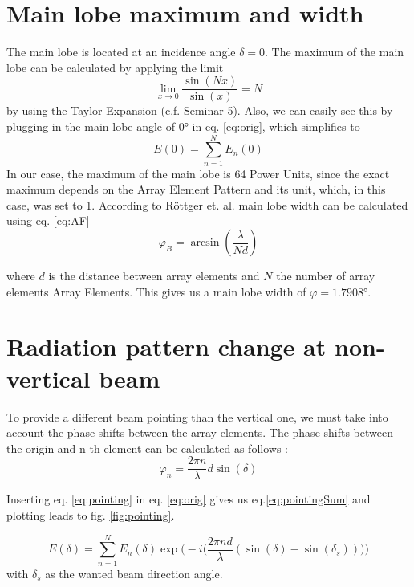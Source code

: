 \section{Main lobe maximum and width}
The main lobe is located at an incidence angle $\delta = 0$. 
The maximum of the main lobe can be calculated by applying the limit $$\lim_{x\to0} \frac{\sin(Nx)}{\sin(x)} = N $$ by using the Taylor-Expansion (c.f. Seminar 5).
Also, we can easily see this by plugging in the main lobe angle of 0° in eq. \ref{eq:orig}, which simplifies to
\begin{equation}
	E(0) = \sum_{n=1}^N E_n(0)
\end{equation}
In our case, the maximum of the main lobe is 64 Power Units, since the exact maximum depends on the Array Element Pattern and its unit, which, in this case, was set to 1.
According to Röttger et. al. \citep{roettger1989instrumental} main lobe width can be calculated using eq. \ref{eq:AF}
\begin{equation}
	\varphi_{B} = \arcsin(\frac{\lambda}{Nd})
\end{equation}

where $d$ is the distance between array elements and $N$ the number of array elements Array Elements. This gives us a main lobe width of $\varphi = 1.7908$°.


\section{Radiation pattern change at non-vertical beam}
To provide a different beam pointing than the vertical one, we must take into account the phase shifts between the array elements. The phase shifts between the origin and n-th element can be calculated as follows \citep{richards2010principles}:
\begin{equation}
	\varphi_n = \frac{2\pi n}{\lambda}d \sin(\delta)
	\label{eq:pointing}
\end{equation}

Inserting eq. \ref{eq:pointing} in eq. \ref{eq:orig} gives us eq.\ref{eq:pointingSum} and plotting leads to fig. \ref{fig:pointing}.

\begin{equation}
	E(\delta) = \sum_{n=1}^N E_n(\delta) \exp \Bigg(-i\Big(\frac{2 \pi nd}{\lambda} (\sin(\delta) - \sin(\delta_s)) \Big)\Bigg)
	\label{eq:pointingSum}
\end{equation}
with $\delta_s$ as the wanted beam direction angle.

